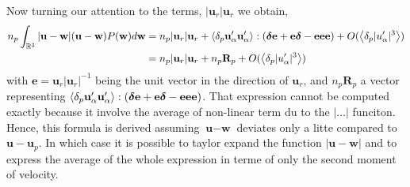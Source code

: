 Now turning our attention to the terms, $|\textbf{u}_r|\textbf{u}_r$ we obtain, 
\begin{align}
    n_p  \int_{\mathbb{R}^3} 
    |\textbf{u}- \textbf{w}| (\textbf{u}-\textbf{w})
    P(\textbf{w})
    d\textbf{w}
    &=
    n_p  
    |\textbf{u}_r|\textbf{u}_r + 
    \pavg{\textbf{u}_\alpha'\textbf{u}_\alpha'}:
    (\bm\delta \textbf{e} +\textbf{e} \bm\delta  - \textbf{eee})
    +O(\pavg{|u_\alpha'|^3})\\
    &=
    n_p  
    |\textbf{u}_r|\textbf{u}_r + 
    n_p \textbf{R}_p
    +O(\pavg{|u_\alpha'|^3})
    \label{eq:standard_dev2}
\end{align}
with $\textbf{e} = \textbf{u}_r|\textbf{u}_r|^{-1}$ being the unit vector in the direction of $\textbf{u}_r$, and $n_p\textbf{R}_p$ a vector representing $\left<\delta_{p} \textbf{u}_\alpha'\textbf{u}_\alpha'\right>: (\bm\delta \textbf{e} +\textbf{e} \bm\delta  - \textbf{eee})$. 
That expression cannot be computed exactly because it involve the average of non-linear term du to the $|\ldots|$ funciton. 
Hence, this formula is derived assuming $\textbf{u}- \textbf{w}$ deviates only a litte compared to $\textbf{u}- \textbf{u}_p$. 
In which case it is possible to taylor expand the function $|\textbf{u}- \textbf{w}|$ and to express the average of the whole expression in terme of only the second moment of velocity. 


